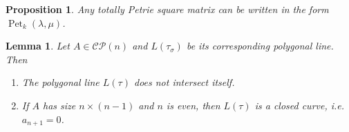 \documentclass[10pt,a4paper]{amsart}
\newtheorem{lemma}{Lemma}
\newtheorem{proposition}{Proposition}
\DeclareMathOperator{\Pet}{Pet}
\begin{document}
        \begin{proposition}\label{prop:extendTotallyPetrie}
            Any totally Petrie square matrix can be written in the form $\Pet_k(\lambda,\mu)$.
        \end{proposition}

        \begin{lemma}
            Let $A\in \mathcal{CP}(n)$ and $L(\tau_{\sigma})$ be its corresponding polygonal line. Then
            \begin{enumerate}
            \item The polygonal line $L(\tau)$ does not intersect itself.
            \item If $A$ has size $n\times (n-1)$ and $n$ is even, then $L(\tau)$ is a closed curve, i.e. $a_{n+1}=0$.
            \end{enumerate}
        \end{lemma}
\end{document}
